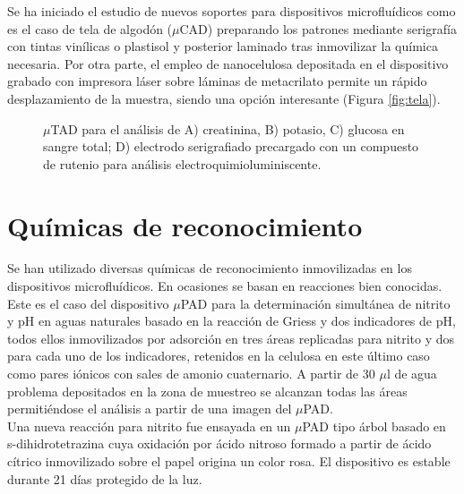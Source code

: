 \documentclass{article}
\begin{document}
Se ha iniciado el estudio de nuevos soportes para dispositivos microfluídicos como es el caso de tela de algodón ($\mu$CAD) preparando los patrones mediante serigrafía con tintas vinílicas o plastisol y posterior laminado tras inmovilizar la química necesaria. Por otra parte, el empleo de nanocelulosa depositada en el dispositivo grabado con impresora láser sobre láminas de metacrilato permite un rápido desplazamiento de la muestra, siendo una opción interesante (Figura \ref{fig:tela}).\\

\begin{figure}[h]
\caption{ $\mu$TAD para el análisis de A) creatinina, B) potasio, C) glucosa en sangre total; D) electrodo serigrafiado precargado con un compuesto de rutenio para análisis electroquimioluminiscente.}
\label{fig:hilo}
\end{figure}


\section{Químicas de reconocimiento}
Se han utilizado diversas químicas de reconocimiento inmovilizadas en los dispositivos microfluídicos. En ocasiones se basan en reacciones bien conocidas. Este es el caso del dispositivo $\mu$PAD para la determinación simultánea de nitrito y pH en aguas naturales basado en la reacción de Griess y dos indicadores de pH, todos ellos inmovilizados por adsorción en tres áreas replicadas para nitrito y dos para cada uno de los indicadores, retenidos en la celulosa en este último caso como pares iónicos con sales de amonio cuaternario. A partir de 30 $\mu$l de agua problema depositados en la zona de muestreo se alcanzan todas las áreas permitiéndose el análisis a partir de una imagen del $\mu$PAD\cite{Lopez-Ruiz2014}.\\
Una nueva reacción para nitrito fue ensayada en un $\mu$PAD tipo árbol basado en s-dihidrotetrazina cuya oxidación por ácido nitroso formado a partir de ácido cítrico inmovilizado sobre el papel origina un color rosa. El dispositivo es estable durante 21 días protegido de la luz\cite{Ortiz-Gomez2016}.\\
\end{document}
